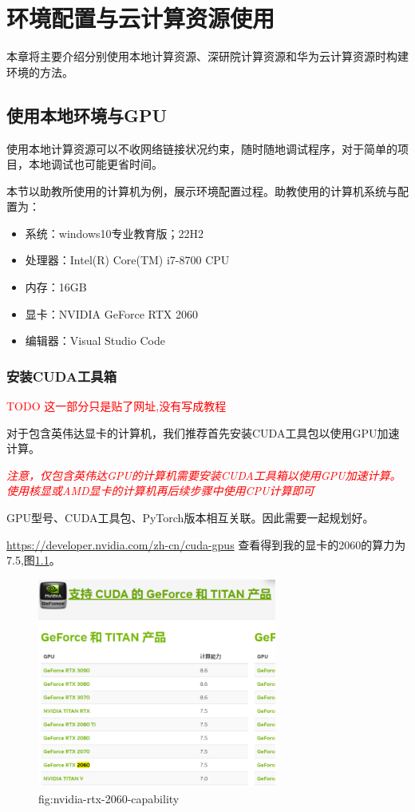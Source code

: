 \chapter{环境配置与云计算资源使用}

本章将主要介绍分别使用本地计算资源、深研院计算资源和华为云计算资源时构建环境的方法。

\section{使用本地环境与GPU}\label{sec:local-env}

使用本地计算资源可以不收网络链接状况约束，随时随地调试程序，对于简单的项目，本地调试也可能更省时间。

本节以助教所使用的计算机为例，展示环境配置过程。助教使用的计算机系统与配置为：
\begin{itemize}
    \item 系统：windows10专业教育版；22H2
    \item 处理器：Intel(R) Core(TM) i7-8700 CPU 
    \item 内存：16GB
    \item 显卡：NVIDIA GeForce RTX 2060
    \item 编辑器：Visual Studio Code
\end{itemize}

\subsection{安装CUDA工具箱}
\textcolor{red}{TODO 这一部分只是贴了网址,没有写成教程}


对于包含英伟达显卡的计算机，我们推荐首先安装CUDA工具包以使用GPU加速计算。

\textcolor{red}{\emph{注意，仅包含英伟达GPU的计算机需要安装CUDA工具箱以使用GPU加速计算。使用核显或AMD显卡的计算机再后续步骤中使用CPU计算即可}}

GPU型号、CUDA工具包、PyTorch版本相互关联。因此需要一起规划好。

\url{https://developer.nvidia.com/zh-cn/cuda-gpus}
查看得到我的显卡的2060的算力为7.5,图\ref{fig:nvidia-rtx-2060-capability}。

\begin{figure}[htbp]
    \centering
    \includegraphics[width=0.7\textwidth]{figures/nvidia-rtx-2060-capability.png}
    \caption{fig:nvidia-rtx-2060-capability}
    \label{fig:nvidia-rtx-2060-capability}
\end{figure}


